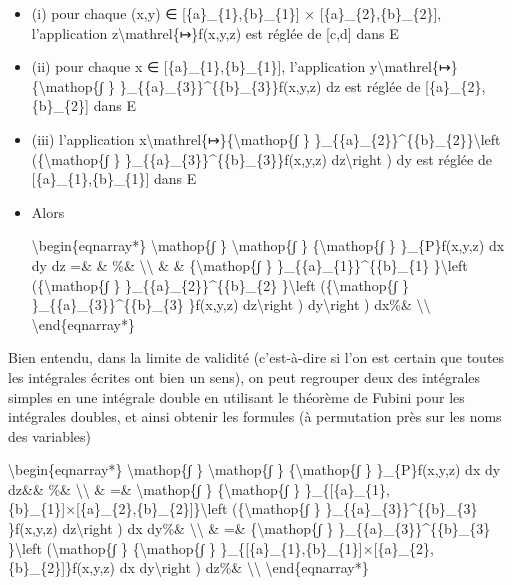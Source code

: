 \documentclass[]{article}
\begin{document}
\begin{itemize}
\item
  (i) pour chaque (x,y) ∈ {[}\{a\}\_\{1\},\{b\}\_\{1\}{]} ×
  {[}\{a\}\_\{2\},\{b\}\_\{2\}{]}, l'application
  z\textbackslash{}mathrel\{↦\}f(x,y,z) est réglée de {[}c,d{]} dans E
\item
  (ii) pour chaque x ∈ {[}\{a\}\_\{1\},\{b\}\_\{1\}{]}, l'application
  y\textbackslash{}mathrel\{↦\}\{\textbackslash{}mathop\{∫ \}
  \}\_\{\{a\}\_\{3\}\}\^{}\{\{b\}\_\{3\}\}f(x,y,z) dz est réglée de
  {[}\{a\}\_\{2\},\{b\}\_\{2\}{]} dans E
\item
  (iii) l'application
  x\textbackslash{}mathrel\{↦\}\{\textbackslash{}mathop\{∫ \}
  \}\_\{\{a\}\_\{2\}\}\^{}\{\{b\}\_\{2\}\}\textbackslash{}left
  (\{\textbackslash{}mathop\{∫ \}
  \}\_\{\{a\}\_\{3\}\}\^{}\{\{b\}\_\{3\}\}f(x,y,z)
  dz\textbackslash{}right ) dy est réglée de
  {[}\{a\}\_\{1\},\{b\}\_\{1\}{]} dans E
\item
  Alors

  \textbackslash{}begin\{eqnarray*\} \textbackslash{}mathop\{∫ \}
  \textbackslash{}mathop\{∫ \} \{\textbackslash{}mathop\{∫ \}
  \}\_\{P\}f(x,y,z) dx dy dz =\& \& \%\&
  \textbackslash{}\textbackslash{} \& \& \{\textbackslash{}mathop\{∫ \}
  \}\_\{\{a\}\_\{1\}\}\^{}\{\{b\}\_\{1\} \}\textbackslash{}left
  (\{\textbackslash{}mathop\{∫ \} \}\_\{\{a\}\_\{2\}\}\^{}\{\{b\}\_\{2\}
  \}\textbackslash{}left (\{\textbackslash{}mathop\{∫ \}
  \}\_\{\{a\}\_\{3\}\}\^{}\{\{b\}\_\{3\} \}f(x,y,z)
  dz\textbackslash{}right ) dy\textbackslash{}right ) dx\%\&
  \textbackslash{}\textbackslash{} \textbackslash{}end\{eqnarray*\}
\end{itemize}

Bien entendu, dans la limite de validité (c'est-à-dire si l'on est
certain que toutes les intégrales écrites ont bien un sens), on peut
regrouper deux des intégrales simples en une intégrale double en
utilisant le théorème de Fubini pour les intégrales doubles, et ainsi
obtenir les formules (à permutation près sur les noms des variables)

\textbackslash{}begin\{eqnarray*\} \textbackslash{}mathop\{∫ \}
\textbackslash{}mathop\{∫ \} \{\textbackslash{}mathop\{∫ \}
\}\_\{P\}f(x,y,z) dx dy dz\&\& \%\& \textbackslash{}\textbackslash{} \&
=\& \textbackslash{}mathop\{∫ \} \{\textbackslash{}mathop\{∫ \}
\}\_\{{[}\{a\}\_\{1\},\{b\}\_\{1\}{]}×{[}\{a\}\_\{2\},\{b\}\_\{2\}{]}\}\textbackslash{}left
(\{\textbackslash{}mathop\{∫ \} \}\_\{\{a\}\_\{3\}\}\^{}\{\{b\}\_\{3\}
\}f(x,y,z) dz\textbackslash{}right ) dx dy\%\&
\textbackslash{}\textbackslash{} \& =\& \{\textbackslash{}mathop\{∫ \}
\}\_\{\{a\}\_\{3\}\}\^{}\{\{b\}\_\{3\} \}\textbackslash{}left
(\textbackslash{}mathop\{∫ \} \{\textbackslash{}mathop\{∫ \}
\}\_\{{[}\{a\}\_\{1\},\{b\}\_\{1\}{]}×{[}\{a\}\_\{2\},\{b\}\_\{2\}{]}\}f(x,y,z)
dx dy\textbackslash{}right ) dz\%\& \textbackslash{}\textbackslash{}
\textbackslash{}end\{eqnarray*\}
\end{document}
